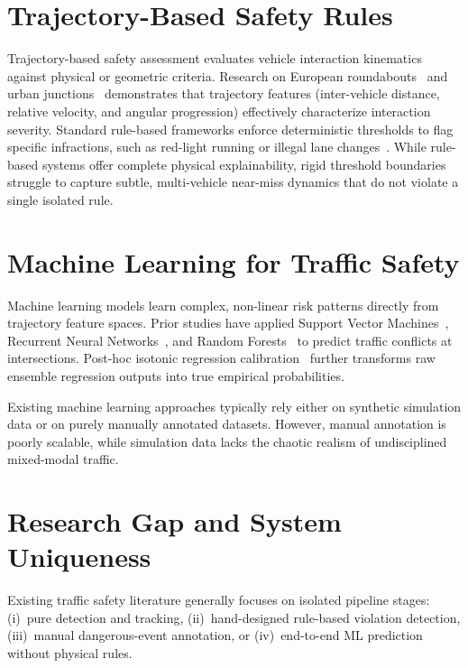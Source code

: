 \section{Trajectory-Based Safety Rules}

Trajectory-based safety assessment evaluates vehicle interaction kinematics against physical or geometric criteria. Research on European roundabouts~\cite{drone_roundabout} and urban junctions~\cite{china_traffic, guennouni2023} demonstrates that trajectory features (inter-vehicle distance, relative velocity, and angular progression) effectively characterize interaction severity. Standard rule-based frameworks enforce deterministic thresholds to flag specific infractions, such as red-light running or illegal lane changes~\cite{huang2022}. While rule-based systems offer complete physical explainability, rigid threshold boundaries struggle to capture subtle, multi-vehicle near-miss dynamics that do not violate a single isolated rule.

\section{Machine Learning for Traffic Safety}

Machine learning models learn complex, non-linear risk patterns directly from trajectory feature spaces. Prior studies have applied Support Vector Machines~\cite{svm_conflict}, Recurrent Neural Networks~\cite{lstm_conflict}, and Random Forests~\cite{rf_conflict, zeng2020} to predict traffic conflicts at intersections. Post-hoc isotonic regression calibration~\cite{isotonic} further transforms raw ensemble regression outputs into true empirical probabilities. 

Existing machine learning approaches typically rely either on synthetic simulation data or on purely manually annotated datasets. However, manual annotation is poorly scalable, while simulation data lacks the chaotic realism of undisciplined mixed-modal traffic.

\section{Research Gap and System Uniqueness}

Existing traffic safety literature generally focuses on isolated pipeline stages: (i)~pure detection and tracking, (ii)~hand-designed rule-based violation detection, (iii)~manual dangerous-event annotation, or (iv)~end-to-end ML prediction without physical rules.

